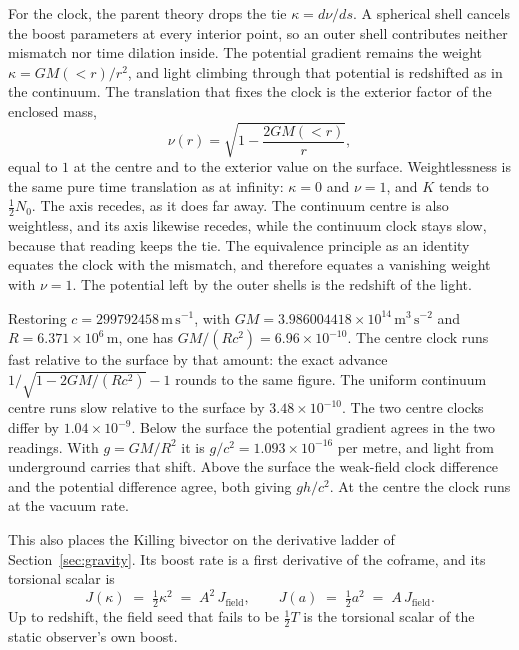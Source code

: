 \documentclass[a4paper]{article}
\begin{document}
For the clock, the parent theory drops the tie \(\kappa=d\nu/ds\). A spherical shell cancels the boost parameters at every interior point, so an outer shell contributes neither mismatch nor time dilation inside. The potential gradient remains the weight \(\kappa=GM(<r)/r^{2}\), and light climbing through that potential is redshifted as in the continuum. The translation that fixes the clock is the exterior factor of the enclosed mass,
\begin{equation}
\label{eq:interior-clock}
\nu(r)=\sqrt{1-\frac{2GM(<r)}{r}},
\end{equation}
equal to \(1\) at the centre and to the exterior value on the surface. Weightlessness is the same pure time translation as at infinity: \(\kappa=0\) and \(\nu=1\), and \(K\) tends to \(\tfrac12 N_{0}\). The axis recedes, as it does far away. The continuum centre is also weightless, and its axis likewise recedes, while the continuum clock stays slow, because that reading keeps the tie. The equivalence principle as an identity equates the clock with the mismatch, and therefore equates a vanishing weight with \(\nu=1\). The potential left by the outer shells is the redshift of the light.

Restoring \(c=299792458\,\mathrm{m\,s^{-1}}\), with \(GM=3.986004418\times 10^{14}\,\mathrm{m^{3}\,s^{-2}}\) and \(R=6.371\times 10^{6}\,\mathrm{m}\), one has \(GM/(Rc^{2})=6.96\times 10^{-10}\). The centre clock runs fast relative to the surface by that amount: the exact advance \(1/\sqrt{1-2GM/(Rc^{2})}-1\) rounds to the same figure. The uniform continuum centre runs slow relative to the surface by \(3.48\times 10^{-10}\). The two centre clocks differ by \(1.04\times 10^{-9}\). Below the surface the potential gradient agrees in the two readings. With \(g=GM/R^{2}\) it is \(g/c^{2}=1.093\times 10^{-16}\) per metre, and light from underground carries that shift. Above the surface the weak-field clock difference and the potential difference agree, both giving \(gh/c^{2}\). At the centre the clock runs at the vacuum rate.

This also places the Killing bivector on the derivative ladder of Section~\ref{sec:gravity}. Its boost rate is a first derivative of the coframe, and its torsional scalar is
\[
J(\kappa) \;=\; \tfrac12\kappa^{2} \;=\; A^{2}\,J_{\mathrm{field}},
\qquad
J(a) \;=\; \tfrac12 a^{2} \;=\; A\,J_{\mathrm{field}}.
\]
Up to redshift, the field seed that fails to be \(\tfrac12T\) is the torsional scalar of the static observer's own boost.
\end{document}
